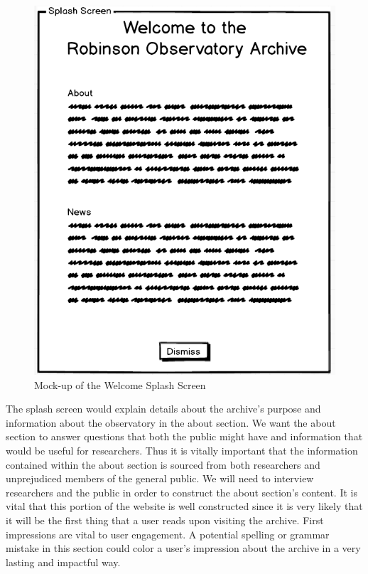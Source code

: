 \documentclass[12pt]{report}
\begin{document}
\begin{enumerate}
\begin{figure}[h]
	\centering
	\includegraphics[scale=0.5]{splash_screen_mockup}
	\caption{Mock-up of the Welcome Splash Screen}
	\label{fig:splashscreenmockup}
\end{figure}

The splash screen would explain details about the archive's purpose and information about the observatory in the about section. We want the about section to answer questions that both the public might have and information that would be useful for researchers. Thus it is vitally important that the information contained within the about section is sourced from both researchers and unprejudiced members of the general public. We will need to interview researchers and the public in order to construct the about section's content. It is vital that this portion of the website is well constructed since it is very likely that it will be the first thing that a user reads upon visiting the archive. First impressions are vital to user engagement. A potential spelling or grammar mistake in this section could color a user's impression about the archive in a very lasting and impactful way.


\end{enumerate}
\end{document}
